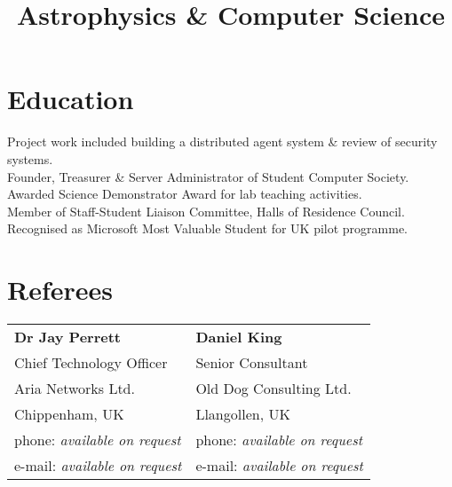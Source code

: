 \documentclass{resume}
\begin{document}
\begin{resume}
\section{Education}

\title{\bf Astrophysics \& Computer Science}
\begin{position}
Project work included building a distributed agent system \& review of security systems.\vspace{1mm}\\
Founder, Treasurer \& Server Administrator of Student Computer Society.\vspace{1mm}\\
Awarded Science Demonstrator Award for lab teaching activities.\vspace{1mm}\\
Member of Staff-Student Liaison Committee, Halls of Residence Council.\vspace{1mm}\\
Recognised as Microsoft Most Valuable Student for UK pilot programme.
\end{position}

\section{Referees} 

\begin{tabular}{@{}p{6cm}p{6cm}}
\textbf{Dr Jay Perrett}                 &  \textbf{Daniel King}                     \\
Chief Technology Officer                &  Senior Consultant                        \\
Aria Networks Ltd.                      &  Old Dog Consulting Ltd.                  \\
Chippenham, UK                          &  Llangollen, UK                           \\
phone: \textsl{available on request}    &  phone: \textsl{available on request}     \\
e-mail: \textsl{available on request}   &  e-mail: \textsl{available on request}    \\
\end{tabular}

\end{resume}
\end{document}
